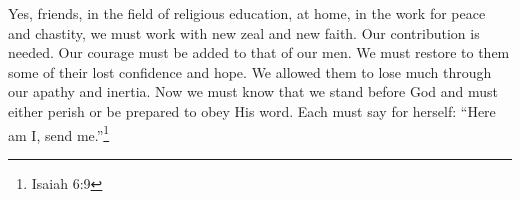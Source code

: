 Yes, friends, in the field of religious education, at
home, in the work for peace and chastity, we must work with
new zeal and new faith. Our contribution is needed. Our
courage must be added to that of our men. We must restore
to them some of their lost confidence and hope. We allowed
them to lose much through our apathy and inertia. Now we
must know that we stand before God and must either perish
or be prepared to obey His word. Each must say for
herself: ``Here am I, send me.''\footnote{Isaiah 6:9}


